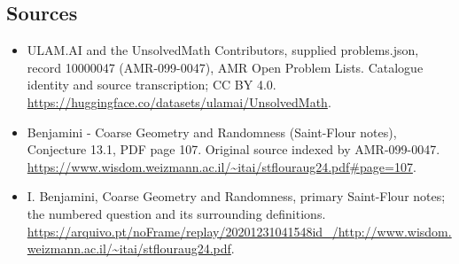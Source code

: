 \documentclass[11pt,a4paper]{article}
\begin{document}
\subsection{Sources}
\begin{itemize}
\item[S1] ULAM.AI and the UnsolvedMath Contributors, supplied problems.json, record 10000047 (AMR-099-0047), AMR Open Problem Lists. Catalogue identity and source transcription; CC BY 4.0.
\url{https://huggingface.co/datasets/ulamai/UnsolvedMath}.
\item[S2] Benjamini - Coarse Geometry and Randomness (Saint-Flour notes), Conjecture 13.1, PDF page 107. Original source indexed by AMR-099-0047.
\url{https://www.wisdom.weizmann.ac.il/~itai/stflouraug24.pdf#page=107}.
\item[S3] I. Benjamini, Coarse Geometry and Randomness, primary Saint-Flour notes; the numbered question and its surrounding definitions.
\url{https://arquivo.pt/noFrame/replay/20201231041548id_/http://www.wisdom.weizmann.ac.il/~itai/stflouraug24.pdf}.
\end{itemize}
\end{document}
